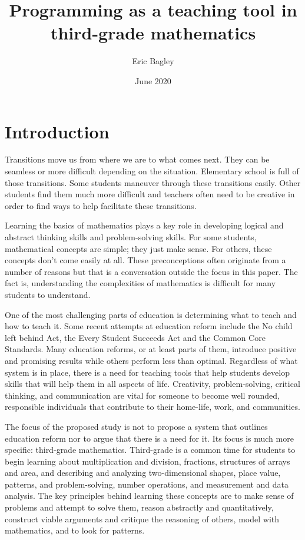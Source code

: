 \documentclass[12pt]{extarticle}
\title{Programming as a teaching tool in third-grade mathematics }
\author{Eric Bagley}
\date{June 2020}
\begin{document}
\maketitle

\section*{Introduction}
Transitions move us from where we are to what comes next. They can be seamless or more difficult depending on the situation. Elementary school is full of those transitions. Some students maneuver through these transitions easily. Other students find them much more difficult and teachers often need to be creative in order to find ways to help facilitate these transitions.

Learning the basics of mathematics plays a key role in developing logical and abstract thinking skills and problem-solving skills. For some students, mathematical concepts are simple; they just make sense. For others, these concepts don’t come easily at all. These preconceptions often originate from a number of reasons but that is a conversation outside the focus in this paper. The fact is, understanding the complexities of mathematics is difficult for many students to understand.

One of the most challenging parts of education is determining what to teach and how to teach it. Some recent attempts at education reform include the No child left behind Act,  the Every Student Succeeds Act and the Common Core Standards. Many education reforms, or at least parts of them, introduce positive and promising results while others perform less than optimal. Regardless of what system is in place, there is a need for teaching tools that help students develop skills that will help them in all aspects of life. Creativity, problem-solving, critical thinking, and communication are vital for someone to become well rounded, responsible individuals that contribute to their home-life, work, and communities.

The focus of the proposed study is not to propose a system that outlines education reform nor to argue that there is a need for it. Its focus is much more specific: third-grade mathematics. Third-grade is a common time for students to begin learning about multiplication and division, fractions, structures of arrays and area, and describing and analyzing two-dimensional shapes, place value, patterns, and problem-solving, number operations, and measurement and data analysis. The key principles behind learning these concepts are to make sense of problems and attempt to solve them, reason abstractly and quantitatively, construct viable arguments and critique the reasoning of others, model with mathematics, and to look for patterns.
\end{document}
